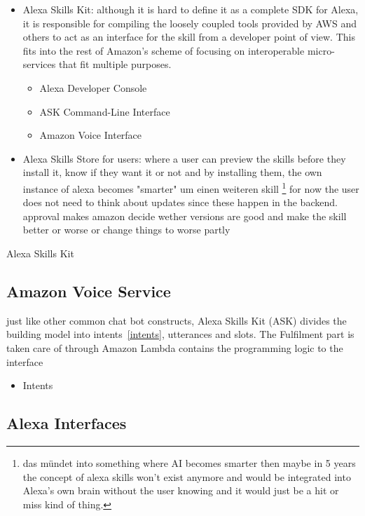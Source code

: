 \begin{itemize}
	\item Alexa Skills Kit: although it is hard to define it as a complete SDK for Alexa, it is responsible for compiling the loosely coupled tools provided by AWS and others to act as an interface for the skill from a developer point of view. This fits into the rest of Amazon's scheme of focusing on interoperable micro-services that fit multiple purposes.
	
	
	\begin{itemize}
		\item Alexa Developer Console
		\item ASK Command-Line Interface 
		\item Amazon Voice Interface
	\end{itemize}
	\item Alexa Skills Store for users: where a user can preview the skills before they install it, know if they want it or not and by installing them, the own instance of alexa becomes "smarter" um einen weiteren skill \footnote{das mündet into something where AI becomes smarter then maybe in 5 years the concept of alexa skills won't exist anymore and would be integrated into Alexa's own brain without the user knowing and it would just be a hit or miss kind of thing.} for now the user does not need to think about updates since these happen in the backend. approval makes amazon decide wether versions are good and make the skill better or worse or change things to worse partly
\end{itemize}
Alexa Skills Kit  




\subsection{Amazon Voice Service}
just like other common chat bot constructs, Alexa Skills Kit (ASK) divides the building model into intents~\ref{intents}, utterances and slots. The Fulfilment part is taken care of through Amazon Lambda contains the programming  logic to the interface
\begin{itemize}
	\item Intents
	\
\end{itemize}


\subsection*{Alexa Interfaces}



